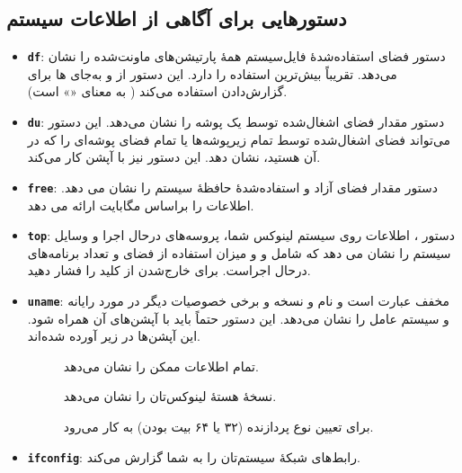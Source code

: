 \subsection{دستورهایی برای آگاهی از اطلاعات سیستم}
\begin{itemize}
\item \textbf{\texttt{\Large df}}: دستور  فضای استفاده‌شدهٔ فایل‌سیستم همهٔ پارتیشن‌های ماونت‌شده را نشان می‌دهد.  تقریباً بیش‌ترین استفاده را دارد. این دستور از  و  به‌جای ها برای گزارش‌دادن استفاده می‌کند ( به معنای «» است).

\item \textbf{\texttt{\Large du}}: دستور  مقدار فضای اشغال‌شده توسط یک پوشه را نشان می‌دهد. این دستور می‌تواند فضای اشغال‌شده توسط تمام زیرپوشه‌ها یا تمام فضای پوشه‌ای را که در آن هستید، نشان دهد. این دستور نیز با آپشن  کار می‌کند.

\item \textbf{\texttt{\Large free}}: دستور  مقدار فضای آزاد و استفاده‌شدهٔ حافظهٔ سیستم را نشان می دهد.  اطلاعات را براساس مگابایت ارائه می دهد.

\item \textbf{\texttt{\Large top}}: دستور ، اطلاعات روی سیستم لینوکس شما، پروسه‌های درحال اجرا و وسایل سیستم را نشان می دهد که شامل  و  و میزان استفاده از فضای  و تعداد برنامه‌های درحال اجراست. برای خارج‌شدن از  کلید  را فشار دهید.

\item \textbf{\texttt{\Large uname}}: مخفف عبارت  است و نام و نسخه و برخی خصوصیات دیگر در مورد رایانه و سیستم عامل را نشان می‌دهد. این دستور حتماً باید با آپشن‌های آن همراه شود. این آپشن‌ها در زیر آورده شده‌اند.
\begin{description}
\item[] تمام اطلاعات ممکن را نشان می‌دهد.

\item[] نسخهٔ هستهٔ لینوکس‌تان را نشان می‌دهد.

\item[] برای تعیین نوع پردازنده (۳۲ یا ۶۴ بیت بودن) به کار می‌رود.
\end{description}

\item \textbf{\texttt{\Large ifconfig}}: رابط‌های شبکهٔ سیستم‌تان را به شما گزارش می‌کند.


\end{itemize}
